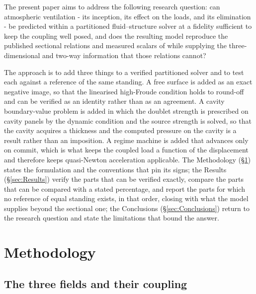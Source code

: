 \documentclass[11pt,a4paper]{article}
\begin{document}
The present paper aims to address the following research question: can
atmospheric ventilation - its inception, its effect on the loads, and its
elimination - be predicted within a partitioned fluid--structure solver at a
fidelity sufficient to keep the coupling well posed, and does the resulting model
reproduce the published sectional relations and measured scalars of
\citet{Harwood2016} while supplying the three-dimensional and two-way
information that those relations cannot?

The approach is to add three things to a verified partitioned solver and to test
each against a reference of the same standing. A free surface is added as an
exact negative image, so that the linearised high-Froude condition holds to
round-off and can be verified as an identity rather than as an agreement. A
cavity boundary-value problem is added in which the doublet strength is
prescribed on cavity panels by the dynamic condition and the source strength is
solved, so that the cavity acquires a thickness and the computed pressure on the
cavity is a result rather than an imposition. A regime machine is added that
advances only on commit, which is what keeps the coupled load a function of the
displacement and therefore keeps quasi-Newton acceleration applicable. The
Methodology (\S\ref{sec:Method}) states the formulation and the conventions that
pin its signs; the Results (\S\ref{sec:Results}) verify the parts that can be
verified exactly, compare the parts that can be compared with a stated
percentage, and report the parts for which no reference of equal standing exists,
in that order, closing with what the model supplies beyond the sectional one; the
Conclusions (\S\ref{sec:Conclusions}) return to the research question and state
the limitations that bound the answer.

\section{Methodology}
\label{sec:Method}

\subsection{The three fields and their coupling}
\label{subsec:Fields}
\end{document}
